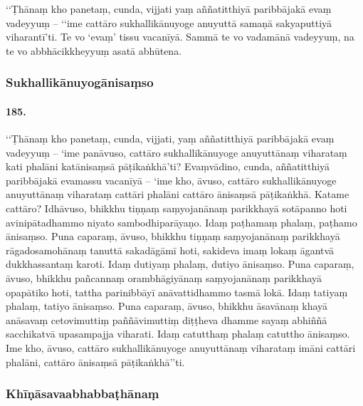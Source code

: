 ‘‘Ṭhānaṃ kho panetaṃ, cunda, vijjati yaṃ aññatitthiyā paribbājakā evaṃ vadeyyuṃ – ‘‘ime cattāro sukhallikānuyoge anuyuttā samaṇā sakyaputtiyā viharantī’ti. Te vo ‘evaṃ’ tissu vacanīyā. Sammā te vo vadamānā vadeyyuṃ, na te vo abbhācikkheyyuṃ asatā abhūtena.

\subsubsection{Sukhallikānuyogānisaṃso}

\paragraph{185.} ‘‘Ṭhānaṃ kho panetaṃ, cunda, vijjati, yaṃ aññatitthiyā paribbājakā evaṃ vadeyyuṃ – ‘ime panāvuso, cattāro sukhallikānuyoge anuyuttānaṃ viharataṃ kati phalāni katānisaṃsā pāṭikaṅkhā’ti? Evaṃvādino, cunda, aññatitthiyā paribbājakā evamassu vacanīyā – ‘ime kho, āvuso, cattāro sukhallikānuyoge anuyuttānaṃ viharataṃ cattāri phalāni cattāro ānisaṃsā pāṭikaṅkhā. Katame cattāro? Idhāvuso, bhikkhu tiṇṇaṃ saṃyojanānaṃ parikkhayā sotāpanno hoti avinipātadhammo niyato sambodhiparāyaṇo. Idaṃ paṭhamaṃ phalaṃ, paṭhamo ānisaṃso. Puna caparaṃ, āvuso, bhikkhu tiṇṇaṃ saṃyojanānaṃ parikkhayā rāgadosamohānaṃ tanuttā sakadāgāmī hoti, sakideva imaṃ lokaṃ āgantvā dukkhassantaṃ karoti. Idaṃ dutiyaṃ phalaṃ, dutiyo ānisaṃso. Puna caparaṃ, āvuso, bhikkhu pañcannaṃ orambhāgiyānaṃ saṃyojanānaṃ parikkhayā opapātiko hoti, tattha parinibbāyī anāvattidhammo tasmā lokā. Idaṃ tatiyaṃ phalaṃ, tatiyo ānisaṃso. Puna caparaṃ, āvuso, bhikkhu āsavānaṃ khayā anāsavaṃ cetovimuttiṃ paññāvimuttiṃ diṭṭheva dhamme sayaṃ abhiññā sacchikatvā upasampajja viharati. Idaṃ catutthaṃ phalaṃ catuttho ānisaṃso. Ime kho, āvuso, cattāro sukhallikānuyoge anuyuttānaṃ viharataṃ imāni cattāri phalāni, cattāro ānisaṃsā pāṭikaṅkhā’’ti.

\subsubsection{Khīṇāsavaabhabbaṭhānaṃ}

